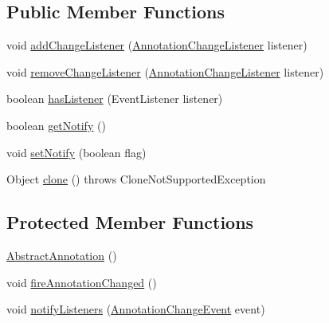 \subsection*{Public Member Functions}
\begin{DoxyCompactItemize}
\item 
void \mbox{\hyperlink{classorg_1_1jfree_1_1chart_1_1annotations_1_1_abstract_annotation_a142d8df764f22560ce23ae44bdc9f4a6}{add\+Change\+Listener}} (\mbox{\hyperlink{interfaceorg_1_1jfree_1_1chart_1_1event_1_1_annotation_change_listener}{Annotation\+Change\+Listener}} listener)
\item 
void \mbox{\hyperlink{classorg_1_1jfree_1_1chart_1_1annotations_1_1_abstract_annotation_a35d547ca28248732aa2a7935ab41f33e}{remove\+Change\+Listener}} (\mbox{\hyperlink{interfaceorg_1_1jfree_1_1chart_1_1event_1_1_annotation_change_listener}{Annotation\+Change\+Listener}} listener)
\item 
boolean \mbox{\hyperlink{classorg_1_1jfree_1_1chart_1_1annotations_1_1_abstract_annotation_a3b5581a6fdb861b037ceaabd7cb1bc8a}{has\+Listener}} (Event\+Listener listener)
\item 
boolean \mbox{\hyperlink{classorg_1_1jfree_1_1chart_1_1annotations_1_1_abstract_annotation_a2c22d59758526f591477be87806b537e}{get\+Notify}} ()
\item 
void \mbox{\hyperlink{classorg_1_1jfree_1_1chart_1_1annotations_1_1_abstract_annotation_ab7788a521170bcce474868752965b910}{set\+Notify}} (boolean flag)
\item 
Object \mbox{\hyperlink{classorg_1_1jfree_1_1chart_1_1annotations_1_1_abstract_annotation_a8ce423f6423f21f6f812d7b49f21358f}{clone}} ()  throws Clone\+Not\+Supported\+Exception 
\end{DoxyCompactItemize}
\subsection*{Protected Member Functions}
\begin{DoxyCompactItemize}
\item 
\mbox{\hyperlink{classorg_1_1jfree_1_1chart_1_1annotations_1_1_abstract_annotation_a6dfa05b83393f195a243121e027568fb}{Abstract\+Annotation}} ()
\item 
void \mbox{\hyperlink{classorg_1_1jfree_1_1chart_1_1annotations_1_1_abstract_annotation_a41abf9fcfb7a461f9095912b1e532b90}{fire\+Annotation\+Changed}} ()
\item 
void \mbox{\hyperlink{classorg_1_1jfree_1_1chart_1_1annotations_1_1_abstract_annotation_aa37a4f29e432fc32fcfb72b407505f30}{notify\+Listeners}} (\mbox{\hyperlink{classorg_1_1jfree_1_1chart_1_1event_1_1_annotation_change_event}{Annotation\+Change\+Event}} event)
\end{DoxyCompactItemize}


